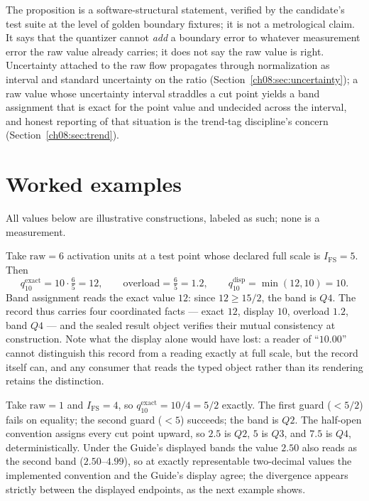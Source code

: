\begin{remark}\label{ch08:rem:proof-scope}
The proposition is a software-structural statement, verified by the
candidate's test suite at the level of golden boundary fixtures; it is not
a metrological claim. It says that the quantizer cannot \emph{add} a
boundary error to whatever measurement error the raw value already
carries; it does not say the raw value is right. Uncertainty attached to
the raw flow propagates through normalization as interval and standard
uncertainty on the ratio (Section~\ref{ch08:sec:uncertainty}); a raw value
whose uncertainty interval straddles a cut point yields a band assignment
that is exact for the point value and undecided across the interval, and
honest reporting of that situation is the trend-tag discipline's concern
(Section~\ref{ch08:sec:trend}).
\end{remark}

\section{Worked examples}\label{ch08:sec:worked}

All values below are illustrative constructions, labeled as such; none is a
measurement.

\begin{example}[Overload: $\mathrm{raw}/I_{\mathrm{FS}} = 1.2$]\label{ch08:ex:overload}
Take $\mathrm{raw} = 6$ activation units at a test point whose declared
full scale is $I_{\mathrm{FS}} = 5$. Then
\[
q_{10}^{\mathrm{exact}} = 10 \cdot \tfrac{6}{5} = 12, \qquad
\mathrm{overload} = \tfrac{6}{5} = 1.2, \qquad
q_{10}^{\mathrm{disp}} = \min(12, 10) = 10 .
\]
Band assignment reads the exact value $12$: since $12 \ge 15/2$, the band
is $Q4$. The record thus carries four coordinated facts --- exact $12$,
display $10$, overload $1.2$, band $Q4$ --- and the sealed result object
verifies their mutual consistency at construction. Note what the display
alone would have lost: a reader of ``$10.00$'' cannot distinguish this
record from a reading exactly at full scale, but the record itself can,
and any consumer that reads the typed object rather than its rendering
retains the distinction.
\end{example}

\begin{example}[Exact cut point: $q_{10}^{\mathrm{exact}} = 2.5$]\label{ch08:ex:cut}
Take $\mathrm{raw} = 1$ and $I_{\mathrm{FS}} = 4$, so
$q_{10}^{\mathrm{exact}} = 10/4 = 5/2$ exactly. The first guard
($< 5/2$) fails on equality; the second guard ($< 5$) succeeds; the band
is $Q2$. The half-open convention assigns every cut point upward, so
$2.5$ is $Q2$, $5$ is $Q3$, and $7.5$ is $Q4$, deterministically. Under
the Guide's displayed bands the value $2.50$ also reads as the second band
($2.50$--$4.99$), so at exactly representable two-decimal values the
implemented convention and the Guide's display agree; the divergence
appears strictly between the displayed endpoints, as the next example
shows.
\end{example}


